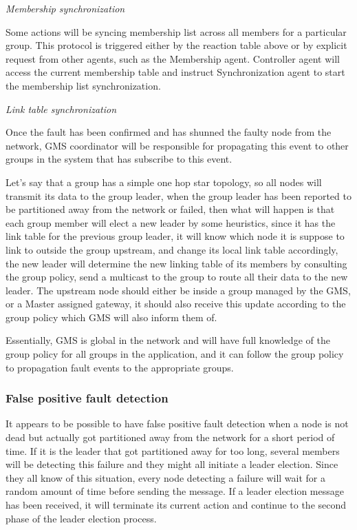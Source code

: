 


\emph{Membership synchronization}

Some actions will be syncing membership list across all members for a particular group. This protocol is triggered either by the reaction table above or by explicit request from other agents, such as the Membership agent. Controller agent will access the current membership table and instruct Synchronization agent to start the membership list synchronization.


\emph{Link table synchronization}

Once the fault has been confirmed and has shunned the faulty node from the network, GMS coordinator will be responsible for propagating this event to other groups in the system that has subscribe to this event.

Let's say that a group has a simple one hop star topology, so all nodes will transmit its data to the group leader, when the group leader has been reported to be partitioned away from the network or failed, then what will happen is that each group member will elect a new leader by some heuristics, since it has the link table for the previous group leader, it will know which node it is suppose to link to outside the group upstream, and change its local link table accordingly, the new leader will determine the new linking table of its members by consulting the group policy, send a multicast to the group to route all their data to the new leader. The upstream node should either be inside a group managed by the GMS, or a Master assigned gateway, it should also receive this update according to the group policy which GMS will also inform them of.

Essentially, GMS is global in the network and will have full knowledge of the group policy for all groups in the application, and it can follow the group policy to propagation fault events to the appropriate groups.


\subsubsection{False positive fault detection}

It appears to be possible to have false positive fault detection when a node is not dead but actually got partitioned away from the network for a short period of time. If it is the leader that got partitioned away for too long, several members will be detecting this failure and they might all initiate a leader election. Since they all know of this situation, every node detecting a failure will wait for a random amount of time before sending the message. If a leader election message has been received, it will terminate its current action and continue to the second phase of the leader election process.

